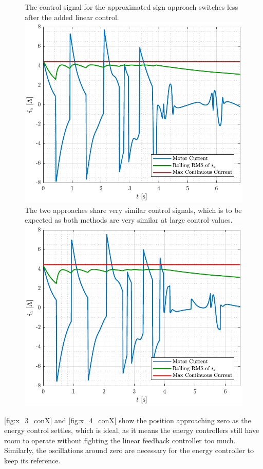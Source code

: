 \begin{figure}[H]
  \hspace{-10pt}
  \captionbox
  {
    The control signal for the approximated sign approach switches less after the added linear control.
    \label{fig:ia_3_conX}
  }
  {
    \hspace{-1cm}
    \includegraphics[width=.46\textwidth]{figures/ia_3_conX}
  }
  \hspace{20pt}
  \captionbox 
  {
    The two approaches share very similar control signals, which is to be expected as both methods are very similar at large control values.
    \label{fig:ia_4_conX}
  }
  {
    \hspace{-1cm}
    \includegraphics[width=.46\textwidth]{figures/ia_4_conX}
  }  
\end{figure}
%
\autoref{fig:x_3_conX} and \ref{fig:x_4_conX} show the position approaching zero as the energy control settles, which is ideal, as it means the energy controllers still have room to operate without fighting the linear feedback controller too much. Similarly, the oscillations around zero are necessary for the energy controller to keep its reference.
%
